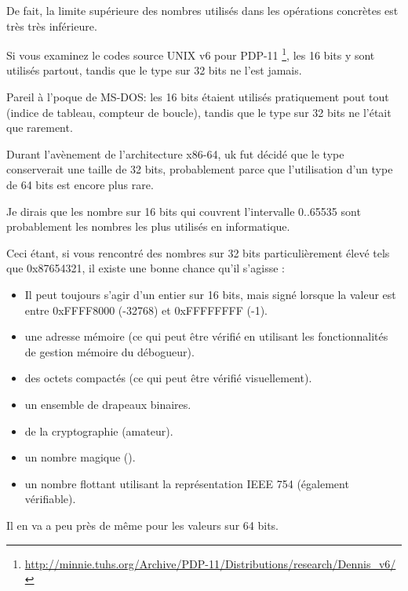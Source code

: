De fait, la limite supérieure des nombres utilisés dans les opérations concrètes est très très inférieure.

Si vous examinez le codes source UNIX v6 pour PDP-11
\footnote{\url{http://minnie.tuhs.org/Archive/PDP-11/Distributions/research/Dennis_v6/}},
les  16 bits y sont utilisés partout, tandis que le type  sur 32 bits ne l'est jamais.

Pareil à l'poque de MS-DOS: les  16 bits étaient utilisés pratiquement pout tout (indice de tableau, compteur de boucle),
tandis que le type  sur 32 bits ne l'était que rarement.

Durant l'avènement de l'architecture x86-64, uk fut décidé que le type  conserverait une taille de 32 bits,
probablement parce que l'utilisation d'un type  de 64 bits est encore plus rare.

Je dirais que les nombre sur 16 bits qui couvrent l'intervalle 0..65535 sont probablement les nombres les plus
utilisés en informatique.

Ceci étant, si vous rencontré des nombres sur 32 bits particulièrement élevé tels que 0x87654321, il existe une
bonne chance qu'il s'agisse :

\begin{itemize}

\item Il peut toujours s'agir d'un entier sur 16 bits, mais signé lorsque la valeur est entre 0xFFFF8000 (-32768) et 0xFFFFFFFF (-1).
\item une adresse mémoire (ce qui peut être vérifié en utilisant les fonctionnalités de gestion mémoire du débogueur).
\item des octets compactés (ce qui peut être vérifié visuellement).
\item un ensemble de drapeaux binaires.
\item de la cryptographie (amateur).
\item un nombre magique ().
\item un nombre flottant utilisant la représentation IEEE 754 (également vérifiable).

\end{itemize}

Il en va a peu près de même pour les valeurs sur 64 bits.


